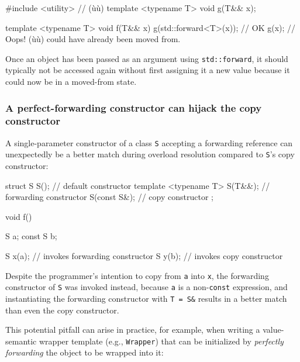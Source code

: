 \begin{emcppshiddenlisting}[emcppsbatch=e17]
#include <utility>      // (ù{}ù)
template <typename T>
void g(T&& x);
\end{emcppshiddenlisting}
\begin{emcppslisting}[emcppsbatch=e17]
template <typename T>
void f(T&& x)
{
    g(std::forward<T>(x));  // OK
    g(x);                   // Oops! (ù{}ù) could have already been moved from.
}
\end{emcppslisting}

\noindent Once an object has been passed as an argument using
\lstinline!std::forward!, it should typically not be accessed again
without first assigning it a new value because it could now be in a
moved-from state.

\subsubsection[A perfect-forwarding constructor can hijack the copy constructor]{A perfect-forwarding constructor can hijack the copy constructor}\label{a-perfect-forwarding-constructor-can-hijack-the-copy-constructor}

A single-parameter constructor of a class \lstinline!S! accepting a
forwarding reference can unexpectedly be a better match during overload
resolution compared to \lstinline!S!'s copy constructor:

\begin{emcppslisting}
struct S
{
    S();                           // default constructor
    template <typename T> S(T&&);  // forwarding constructor
    S(const S&);                   // copy constructor
};

void f()
{
    S a;
    const S b;

    S x(a);  // invokes forwarding constructor
    S y(b);  // invokes copy constructor
}
\end{emcppslisting}

\noindent Despite the programmer's intention to copy from \lstinline!a! into
\lstinline!x!, the forwarding constructor of \lstinline!S! was invoked
instead, because \lstinline!a! is a non-\lstinline!const! 
expression, and instantiating the forwarding constructor with
\lstinline!T!~\lstinline!=!~\lstinline!S&! results in a better match than even
the copy constructor.

This potential pitfall can arise in practice, for example, when writing
a value-semantic wrapper template (e.g., \lstinline!Wrapper!) that can be
initialized by \textit{perfectly forwarding} the object to be wrapped into it:

